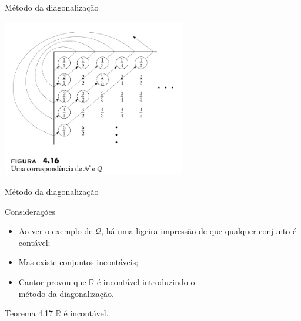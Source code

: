 \documentclass[xcolor=dvipsnames,table]{beamer}
\begin{document}
	\begin{frame}{Método da diagonalização}
		\begin{center}
    		\includegraphics[width=8cm]{images/diagonal.png}
  		\end{center}
	\end{frame}
	
	\begin{frame}{Método da diagonalização}
		\begin{block}{Considerações}
			\begin{itemize}
				\item Ao ver o exemplo de  $\mathcal{Q}$, há uma ligeira impressão de que qualquer conjunto é contável; 
				\item Mas existe conjuntos incontáveis; 
				\item Cantor provou que $\mathbb{R}$ é incontável introduzindo o \\método da diagonalização.
			\end{itemize}
		\end{block} 
		\begin{block}{Teorema 4.17}
			$\mathbb{R}$ é incontável.
		\end{block}
	\end{frame}
	
\end{document}
